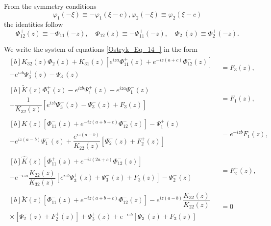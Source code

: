 From the symmetry conditions
\begin{equation} \label{Ostryk_Eq_16_} 
\varphi _{1} (-\xi )\equiv -\varphi _{1} (\xi -c),    \varphi _{2} (-\xi )\equiv \varphi _{2} (\xi -c) 
\end{equation} 
the identities follow
\begin{equation} \label{Ostryk_Eq_17_} 
\Phi _{12}^{+} (z)\equiv -\Phi _{11}^{-} (-z),  \quad  \Phi _{12}^{-} (z)\equiv -\Phi _{11}^{+} (-z),  \quad  \Phi _{2}^{-} (z)\equiv \Phi _{2}^{+} (-z).  
\end{equation} 

We write the system of equations \eqref{Ostryk_Eq_14_} in the form
\begin{equation} \label{Ostryk_Eq_18_}
\begin{aligned}
	\begin{multlined}[b]
		K_{32}(z) \Phi_2(z) + K_{31}(z)\left[ e^{i z a} \Phi_{11}^{+}(z) + e^{-i z(a + c)} \Phi_{12}^{-}(z) \right] 
		\\
		- e^{i z b} \Psi_3^{+}(z) - \Psi_3^{-}(z) 
	\end{multlined}
	&= F_3(z),
	\\
	\begin{multlined}[b]
		\tilde{K}(z) \Phi_1^{+}(z) - e^{i z b} \Psi_1^{+}(z) - e^{i z a} \Psi_1^{-}(z) 
		\\
		+ \dfrac{1}{K_{32}(z)}\left[ e^{i z b} \Psi_3^{+}(z) - \Psi_3^{-}(z) + F_3(z) \right] 
	\end{multlined}
	&= F_1(z),
	\\
	\begin{multlined}[b]
		K(z)\left[ \Phi_{11}^{-}(z) + e^{-i z(a + b + c)} \Phi_{12}^{-}(z) \right] - \Psi_1^{+}(z)
		\\
		- e^{i z(a - b)} \Psi_1^{-}(z)+ \dfrac{e^{i z(a - b)}}{K_{22}(z)} \left[ \Psi_2^{-}(z) + F_2^{+}(z) \right] 
	\end{multlined}
	&=e^{-i z b} F_1(z),
	\\
	\begin{multlined}[b]
		\widehat{K}(z)\left[ \Phi_{11}^{+}(z) + e^{-i z(2a + c)} \Phi_{12}^{-}(z) \right] 
		\\
		+ e^{-i z a} \dfrac{K_{22}(z)}{K_{32}(z)} \left[ e^{i z b} \Psi_3^{+}(z) + \Psi_3^{-}(z) + F_3(z) \right]- \Psi_2^{-}(z) 
	\end{multlined}
	&= F_2^{+}(z),
	\\
	\begin{multlined}[b]
		\breve{K}(z)\left[ \Phi_{11}^{-}(z) + e^{-i z(a + b + c)} \Phi_{12}^{-}(z) \right] 	- e^{i z(a - b)}\dfrac{K_{32}(z)}{K_{22}(z)}
		\\
		\times \left[ \Psi_2^{-}(z) + F_2^{+}(z) \right]+ \Psi_3^{+}(z) + e^{-i z b} \left[ \Psi_3^{-}(z) + F_3(z) \right] 
	\end{multlined}
	&= 0
\end{aligned}
\end{equation}

